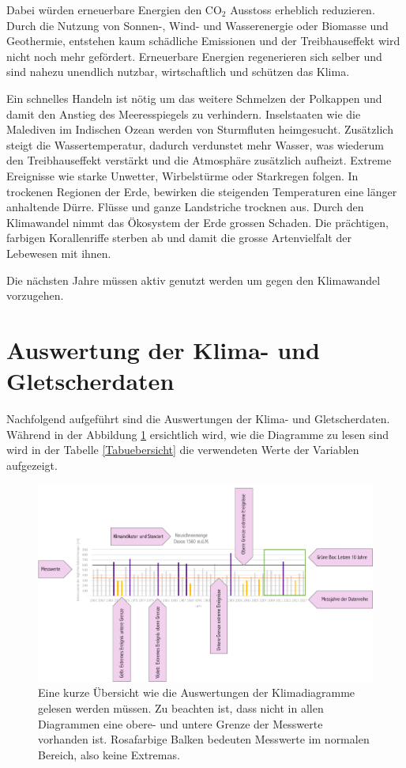 \begin{refsection}
Dabei würden erneuerbare Energien den CO$_2$ Ausstoss erheblich reduzieren. Durch die Nutzung von Sonnen-, Wind- und Wasserenergie oder Biomasse und Geothermie, entstehen kaum schädliche Emissionen und der Treibhauseffekt wird nicht noch mehr gefördert. Erneuerbare Energien regenerieren sich selber und sind nahezu unendlich nutzbar, wirtschaftlich und schützen das Klima.

Ein schnelles Handeln ist nötig um das weitere Schmelzen der Polkappen und damit den Anstieg des Meeresspiegels zu verhindern. Inselstaaten wie die Malediven im Indischen Ozean werden von Sturmfluten heimgesucht. Zusätzlich steigt die Wassertemperatur, dadurch verdunstet mehr Wasser, was wiederum den Treibhauseffekt verstärkt und die Atmosphäre zusätzlich aufheizt. Extreme Ereignisse wie starke Unwetter, Wirbelstürme oder Starkregen folgen. In trockenen Regionen der Erde, bewirken die steigenden Temperaturen eine länger anhaltende Dürre. Flüsse und ganze Landstriche trocknen aus.
Durch den Klimawandel nimmt das Ökosystem der Erde grossen Schaden. Die prächtigen, farbigen Korallenriffe sterben ab und damit die grosse Artenvielfalt der Lebewesen mit ihnen.

Die nächsten Jahre müssen aktiv genutzt werden um gegen den Klimawandel vorzugehen. 


\section{Auswertung der Klima- und Gletscherdaten} \label{AuswertungKG}
Nachfolgend aufgeführt sind die Auswertungen der Klima- und Gletscherdaten. Während in der Abbildung \ref{KlimaDia} ersichtlich wird, wie die Diagramme zu lesen sind wird in der Tabelle \ref{Tabuebersicht} die verwendeten Werte der Variablen aufgezeigt.


\begin{figure}
\centering
\includegraphics[width=1.0\textwidth]{extrem/Klimadiagrammlesen.pdf}
\caption{Eine kurze Übersicht wie die Auswertungen der Klimadiagramme gelesen werden müssen. Zu beachten ist, dass nicht in allen Diagrammen eine obere- und untere Grenze der Messwerte vorhanden ist. Rosafarbige Balken bedeuten Messwerte im normalen Bereich, also keine Extremas.}
\label{KlimaDia}
\end{figure}


\end{refsection}
